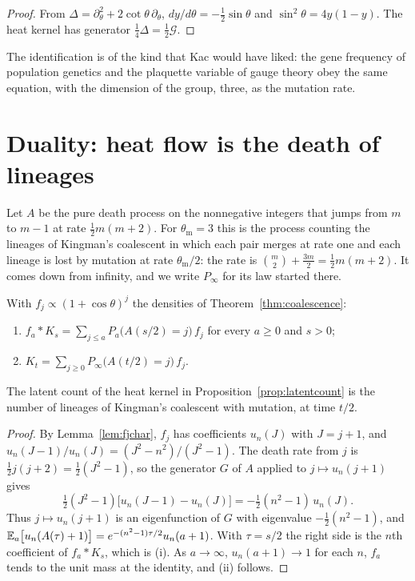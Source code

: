 \begin{proof}
From $\Delta=\partial_\theta^2+2\cot\theta\,\partial_\theta$, $dy/d\theta=-\frac12\sin\theta$ and $\sin^2\theta=4y(1-y)$. The heat kernel has generator $\frac14\Delta=\frac12\mathcal G$.
\end{proof}

The identification is of the kind that Kac would have liked: the gene frequency of population genetics and the plaquette variable of gauge theory obey the same equation, with the dimension of the group, three, as the mutation rate.

\section{Duality: heat flow is the death of lineages}\label{sec:duality}

Let $A$ be the pure death process on the nonnegative integers that jumps from $m$ to $m-1$ at rate $\frac12m(m+2)$. For $\theta_{\mathrm m}=3$ this is the process counting the lineages of Kingman's coalescent in which each pair merges at rate one and each lineage is lost by mutation at rate $\theta_{\mathrm m}/2$: the rate is $\binom m2+\frac{3m}2=\frac12m(m+2)$. It comes down from infinity, and we write $P_\infty$ for its law started there.

\begin{theorem}\label{thm:kingman}
With $f_j\propto(1+\cos\theta)^j$ the densities of Theorem~\ref{thm:coalescence}:
\begin{enumerate}
\item[(i)] $f_a*K_s=\sum_{j\le a}P_a\big(A(s/2)=j\big)\,f_j$ for every $a\ge0$ and $s>0$;
\item[(ii)] $K_t=\sum_{j\ge0}P_\infty\big(A(t/2)=j\big)\,f_j$.
\end{enumerate}
The latent count of the heat kernel in Proposition~\ref{prop:latentcount} is the number of lineages of Kingman's coalescent with mutation, at time $t/2$.
\end{theorem}

\begin{proof}
By Lemma~\ref{lem:fjchar}, $f_j$ has coefficients $u_n(J)$ with $J=j+1$, and $u_n(J-1)/u_n(J)=(J^2-n^2)/(J^2-1)$. The death rate from $j$ is $\frac12j(j+2)=\frac12(J^2-1)$, so the generator $G$ of $A$ applied to $j\mapsto u_n(j+1)$ gives
\[
\tfrac12(J^2-1)\big[u_n(J-1)-u_n(J)\big]=-\tfrac12(n^2-1)\,u_n(J).
\]
Thus $j\mapsto u_n(j+1)$ is an eigenfunction of $G$ with eigenvalue $-\frac12(n^2-1)$, and $\mathbb{E}_a\big[u_n(A(\tau)+1)\big]=e^{-(n^2-1)\tau/2}u_n(a+1)$. With $\tau=s/2$ the right side is the $n$th coefficient of $f_a*K_s$, which is (i). As $a\to\infty$, $u_n(a+1)\to1$ for each $n$, $f_a$ tends to the unit mass at the identity, and (ii) follows.
\end{proof}

